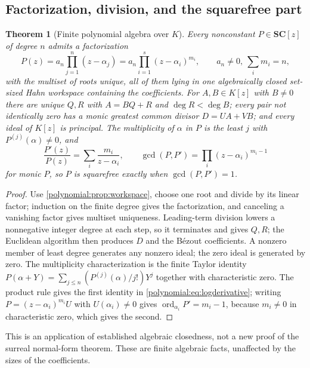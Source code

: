 \documentclass[11pt,letterpaper]{article}
\numberwithin{equation}{section}
\newtheorem{theorem}{Theorem}[section]
\theoremstyle{definition}
\theoremstyle{remark}\newtheorem{remark}[theorem]{Remark}
\newcommand{\SC}{\mathbf{SC}}
\newcommand{\ord}{\operatorname{ord}}
\begin{document}
\subsection{Factorization, division, and the squarefree part}
\begin{theorem}[Finite polynomial algebra over $K$]\label{polynomial:thm:fta}
Every nonconstant $P\in\SC[z]$ of degree $n$ admits a factorization
\begin{equation}\label{polynomial:eq:factorization}
 P(z)=a_n\prod_{j=1}^n(z-\alpha_j)
 =a_n\prod_{i=1}^s(z-\alpha_i)^{m_i},\qquad a_n\ne0,\ \textstyle\sum_i m_i=n,
\end{equation}
with the multiset of roots unique, all of them lying in one algebraically
closed set-sized Hahn workspace containing the coefficients. For
$A,B\in K[z]$ with $B\ne0$ there are unique $Q,R$ with $A=BQ+R$ and
$\deg R<\deg B$; every pair not identically zero has a monic greatest common
divisor $D=UA+VB$; and every ideal of $K[z]$ is principal. The multiplicity of
$\alpha$ in $P$ is the least $j$ with $P^{(j)}(\alpha)\ne0$, and
\begin{equation}\label{polynomial:eq:logderivative}
 \frac{P'(z)}{P(z)}=\sum_{i}\frac{m_i}{z-\alpha_i},
 \qquad
 \gcd(P,P')=\prod_i(z-\alpha_i)^{m_i-1}
\end{equation}
for monic $P$, so $P$ is squarefree exactly when $\gcd(P,P')=1$.
\end{theorem}
\begin{proof}
Use \cref{polynomial:prop:workspace}, choose one root and divide by its linear
factor; induction on the finite degree gives the factorization, and canceling
a vanishing factor gives multiset uniqueness. Leading-term division lowers a
nonnegative integer degree at each step, so it terminates and gives $Q,R$; the
Euclidean algorithm then produces $D$ and the B\'ezout coefficients. A
nonzero member of least degree generates any nonzero ideal; the zero ideal
is generated by zero. The multiplicity
characterization is the finite Taylor identity
$P(\alpha+Y)=\sum_{j\le n}(P^{(j)}(\alpha)/j!)Y^j$ together with
characteristic zero. The product rule gives the first identity in
\eqref{polynomial:eq:logderivative}; writing $P=(z-\alpha_i)^{m_i}U$ with
$U(\alpha_i)\ne0$ gives $\ord_{\alpha_i}P'=m_i-1$, because $m_i\ne0$ in
characteristic zero, which gives the second.
\end{proof}

This is an application of established algebraic closedness, not a new proof of
the surreal normal-form theorem. These are finite algebraic facts, unaffected
by the sizes of the coefficients.
\end{document}
